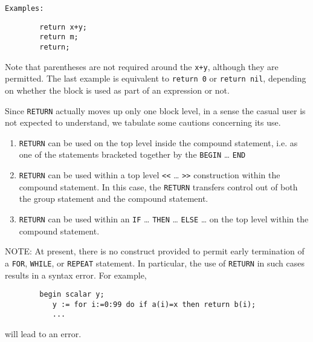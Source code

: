 \texttt{Examples:}
\begin{verbatim}
        return x+y;
        return m;
        return;
\end{verbatim}
Note that parentheses are not required around the \texttt{x+y}, although they
are permitted.  The last example is equivalent to \texttt{return 0} or 
\texttt{return nil}, depending on whether the block is used as part of an
expression or not.

Since \texttt{RETURN} actually moves up only one
block level, in a sense the casual user is not expected to
understand, we tabulate some cautions concerning its use.
\begin{enumerate}
\item \texttt{RETURN} can be used on the top level inside the compound
statement, i.e. as one of the statements bracketed together by the 
\texttt{BEGIN} \ldots{} \texttt{END}

\item \texttt{RETURN} can be used within a top level \texttt{<}\texttt{<}
  \ldots{} \texttt{>}\texttt{>} construction within the compound statement. In
  this case, the \texttt{RETURN} transfers control out of both the
  group statement and the compound statement.

\item \texttt{RETURN} can be used within an \texttt{IF} \ldots{}
  \texttt{THEN} \ldots{} \texttt{ELSE} \ldots{} on the top level within
  the compound statement.
\end{enumerate}
NOTE:  At present, there is no construct provided to permit early
termination of a \texttt{FOR}, \texttt{WHILE},
or \texttt{REPEAT} statement.  In particular, the use of
\texttt{RETURN} in such cases results in a syntax error.  For example,
\begin{verbatim}
        begin scalar y;
           y := for i:=0:99 do if a(i)=x then return b(i);
           ...
\end{verbatim}
will lead to an error.

